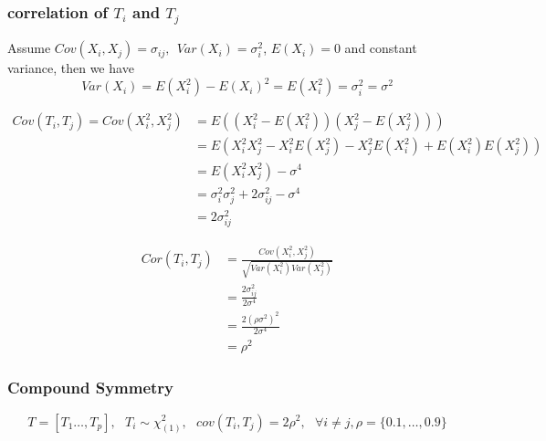 \documentclass[]{article}
\begin{document}
\subsubsection{\texorpdfstring{correlation of \(T_i\) and
\(T_j\)}{correlation of T\_i and T\_j}}\label{correlation-of-t_i-and-t_j}

Assume \(Cov(X_i,X_j) = \sigma_{ij}, ~~ Var(X_i) = \sigma_i^2\),
\(E(X_i) = 0\) and constant variance, then we have \[
  Var(X_i) = E(X_i^2) - E(X_i)^2 = E(X_i^2) = \sigma_i^2 = \sigma^2
\]

\begin{align*}
  Cov(T_i, T_j) = Cov(X_i^2, X_j^2) &= E\left((X_i^2 - E(X_i^2))(X_j^2 - E(X_j^2))\right) \\ 
                                    &= E(X_i^2X_j^2 - X_i^2E(X_j^2) - X_j^2E(X_i^2) + E(X_i^2)E(X_j^2)) \\
                                    &= E(X_i^2X_j^2) - \sigma^4 \\ 
                                    &= \sigma_i^2\sigma_j^2 + 2\sigma_{ij}^2 - \sigma^4 \\ 
                                    &= 2\sigma^2_{ij}
\end{align*}

\begin{align*}
  Cor(T_i, T_j) &= \frac{Cov(X_i^2, X_j^2)}{\sqrt{Var(X_i^2)Var(X_j^2)}}\\
                &= \frac{2\sigma^2_{ij}}{2 \sigma^4} \\
                &= \frac{2(\rho\sigma^2)^2}{2 \sigma^4} \\
                &= \rho^2
\end{align*}

\newpage

\subsubsection{Compound Symmetry}\label{compound-symmetry}

\[
  T = [T_1 \dots, T_p] ,~~~ T_i \sim \chi_{(1)}^2, ~~~ cov(T_i, T_j) = 2\rho^2,~~~ \forall  i \ne j, \rho = \{0.1, \dots, 0.9 \} 
\]
\end{document}
